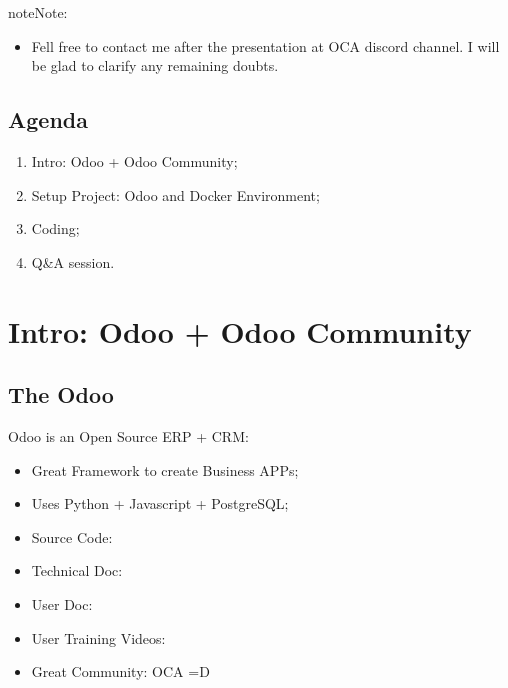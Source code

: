 \documentclass[letterpaper,10pt,english]{sphinxmanual}
\begin{document}
\begin{sphinxadmonition}{note}{Note:}\begin{itemize}
\item {} 
Fell free to contact me after the presentation at OCA discord channel. I will be glad to clarify any remaining doubts.

\end{itemize}
\end{sphinxadmonition}


\section{Agenda}
\label{\detokenize{technical:agenda}}\begin{enumerate}
%
\item {} 
Intro: Odoo + Odoo Community;

\item {} 
Setup Project: Odoo and Docker Environment;

\item {} 
Coding;

\item {} 
Q\&A session.

\end{enumerate}


\chapter{Intro: Odoo + Odoo Community}
\label{\detokenize{technical:intro-odoo-odoo-community}}

\section{The Odoo}
\label{\detokenize{technical:the-odoo}}
Odoo is an Open Source ERP + CRM:
\begin{itemize}
\item {} 
Great Framework to create Business APPs;

\item {} 
Uses Python + Javascript + PostgreSQL;

\item {} 
Source Code: 

\item {} 
Technical Doc: 

\item {} 
User Doc: 

\item {} 
User Training Videos: 

\item {} 
Great Community: OCA =D

\end{itemize}
\end{document}
